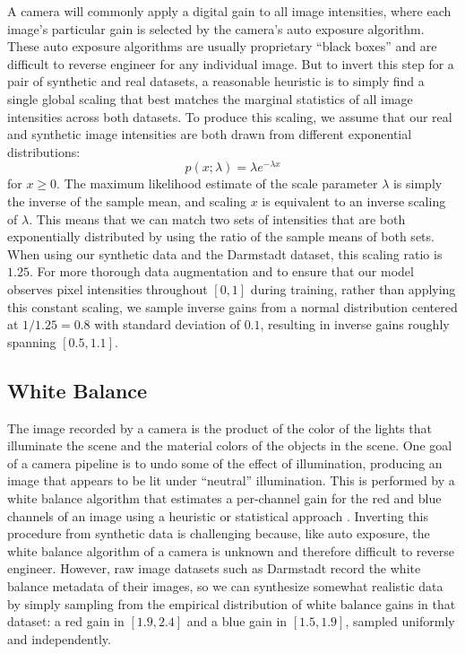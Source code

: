 \documentclass[10pt,twocolumn,letterpaper]{article}
\begin{document}
A camera will commonly apply a digital gain to all image intensities, where each image's particular gain is selected by the camera's auto exposure algorithm. These auto exposure algorithms are usually proprietary ``black boxes'' and are difficult to reverse engineer for any individual image. But to invert this step for a pair of synthetic and real datasets, a reasonable heuristic is to simply find a single global scaling that best matches the marginal statistics of all image intensities across both datasets.
To produce this scaling, we assume that our real and synthetic image intensities are both drawn from different exponential distributions:
\begin{equation}
\displaystyle p(x ; \lambda )=\lambda e^{-\lambda x}
\end{equation}
for $x \geq 0$. The maximum likelihood estimate of the scale parameter $\lambda$ is simply the inverse of the sample mean, and scaling $x$ is equivalent to an inverse scaling of $\lambda$. This means that we can match two sets of intensities that are both exponentially distributed by using the ratio of the sample means of both sets. When using our synthetic data
and the Darmstadt dataset, this scaling ratio is $1.25$. For more thorough data augmentation and to ensure that our model observes pixel intensities throughout $[0, 1]$ during training, rather than applying this constant scaling, we sample inverse gains from a normal distribution centered at $1 / 1.25 = 0.8$ with standard deviation of $0.1$, resulting in inverse gains roughly spanning $[0.5, 1.1]$.

\subsection{White Balance}
\label{sec:wb}

The image recorded by a camera is the product of the color of the lights that illuminate the scene and the material colors of the objects in the scene.
One goal of a camera pipeline is to undo some of the effect of illumination, producing an image that appears to be lit under ``neutral'' illumination.
This is performed by a white balance algorithm that estimates a per-channel gain for the red and blue channels of an image using a heuristic or statistical approach \cite{Gijsenij2011,BarronTsai2017}.
Inverting this procedure from synthetic data is challenging because, like auto exposure, the white balance algorithm of a camera is unknown and therefore difficult to reverse engineer. However, raw image datasets such as Darmstadt record the white balance metadata of their images, so we can synthesize somewhat realistic data by simply sampling from the empirical distribution of white balance gains in that dataset: a red gain in $[1.9, 2.4]$ and a blue gain in $[1.5, 1.9]$, sampled uniformly and independently.
\end{document}

